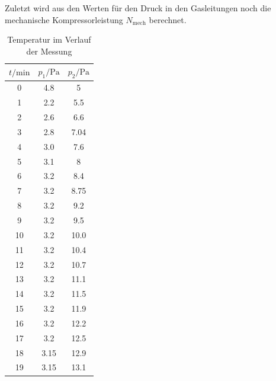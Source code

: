 Zuletzt wird aus den Werten für den Druck in den Gasleitungen noch die mechanische Kompressorleistung $N_{\text{mech}}$ berechnet.

\begin{table}
\centering
\caption{Temperatur im Verlauf der Messung}
\label{tab:Dicke}
  \begin{tabular}{c c c}
    \toprule
    $ t/\mathrm{min}$ & $p_1/\si{\pascal}$& $p_2/\si{\pascal}$\\
    \midrule 
    0   & 4.8  & 5   \\
    1   & 2.2  & 5.5 \\
    2   & 2.6  & 6.6 \\
    3   & 2.8  & 7.04\\
    4   & 3.0  & 7.6 \\
    5   & 3.1  & 8   \\
    6   & 3.2  & 8.4 \\
    7   & 3.2  & 8.75\\
    8   & 3.2  & 9.2 \\
    9   & 3.2  & 9.5 \\
    10  & 3.2  & 10.0\\
    11  & 3.2  & 10.4\\
    12  & 3.2  & 10.7\\
    13  & 3.2  & 11.1\\
    14  & 3.2  & 11.5\\
    15  & 3.2  & 11.9\\
    16  & 3.2  & 12.2\\
    17  & 3.2  & 12.5\\
    18  & 3.15 & 12.9\\
    19  & 3.15 & 13.1\\
    \bottomrule
  \end{tabular}
\end{table}







